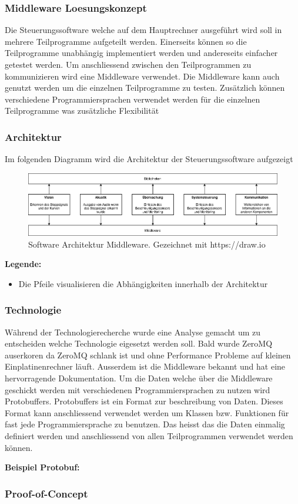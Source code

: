 \documentclass[../../main.tex]{subfiles}
\begin{document}
\subsubsection{Middleware Loesungskonzept}
Die Steuerungssoftware welche auf dem Hauptrechner ausgeführt wird soll in mehrere Teilprogramme aufgeteilt werden.
Einerseits können so die Teilprogramme unabhängig implementiert werden und andereseits einfacher getestet werden.
Um anschliessend zwischen den Teilprogrammen zu kommunizieren wird eine Middleware verwendet. Die Middleware kann auch genutzt werden
um die einzelnen Teilprogramme zu testen. Zusätzlich können verschiedene Programmiersprachen verwendet werden für die einzelnen Teilprogramme
was zusätzliche Flexibilität

\subsubsection{Architektur}
Im folgenden Diagramm wird die Architektur der Steuerungssoftware aufgezeigt
\begin{figure}[H] %
    \centering
    \includegraphics[width=1.0\textwidth]{../../drawings/ArchitekturDiagramm/SW_Architektur_Middleware.png}
    \caption {Software Architektur Middleware. Gezeichnet mit https://draw.io}
\end{figure}

\textbf{Legende:}
\begin{itemize}
    \item Die Pfeile visualisieren die Abhängigkeiten innerhalb der Architektur
\end{itemize}

\subsubsection{Technologie}
Während der Technologierecherche wurde eine Analyse gemacht um zu entscheiden welche Technologie eigesetzt werden soll. Bald wurde ZeroMQ
auserkoren da ZeroMQ schlank ist und ohne Performance Probleme auf kleinen Einplatinenrechner läuft. Ausserdem ist die Middleware bekannt
und hat eine hervorragende Dokumentation. Um die Daten welche über die Middleware geschickt werden mit verschiedenen Programmiersprachen zu
nutzen wird Protobuffers. Protobuffers ist ein Format zur beschreibung von Daten. Dieses Format kann anschliessend verwendet werden um
Klassen bzw. Funktionen für fast jede Programmiersprache zu benutzen. Das heisst das die Daten einmalig definiert werden und anschliessend von
allen Teilprogrammen verwendet werden können.

\textbf{Beispiel Protobuf:}


\subsubsection{Proof-of-Concept}
\end{document}

